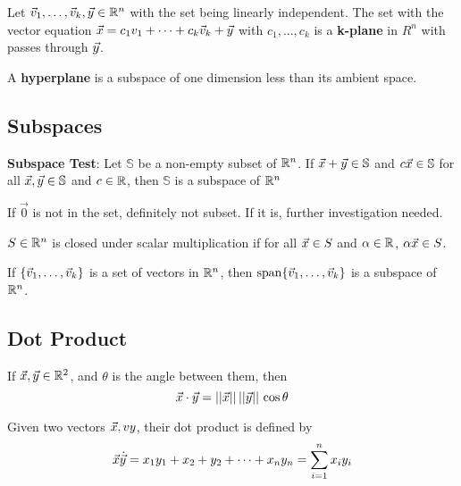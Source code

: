 \documentclass[english, 12pt]{article}
\begin{document}
\begin{defn}
Let $\vec{v}_{1},\dots,\vec{v}_{k},\vec{y} \in {\mathbb{R}}^n$ with the set being linearly independent. The set with the vector equation $\vec{x} = c_{1} v_{1} + \cdots + c_{k} \vec{v}_{k} + \vec{y}$ with $c_{1},\dots,c_{k}$ is a \textbf{k-plane} in $R^n$ with passes through $\vec{y}$.
\end{defn}

\begin{defn}
A \textbf{hyperplane} is a subspace of one dimension less than its ambient space.
\end{defn}

\subsection{Subspaces}

\begin{thrm}
\textbf{Subspace Test}: Let $\mathbb{S}$ be a non-empty subset of ${\mathbb{R}}^n$. If $\vec{x} + \vec{y} \in \mathbb{S}$ and $c \vec{x} \in \mathbb{S}$ for all $\vec{x},\vec{y} \in \mathbb{S}$ and $c \in {\mathbb{R}}$, then $\mathbb{S}$ is a subspace of ${\mathbb{R}}^n$
\end{thrm}

\begin{qte}
If $\vec{0}$ is not in the set, definitely not subset. If it is, further investigation needed.
\end{qte}

\begin{defn}
$S \in {\mathbb{R}}^n$ is closed under scalar multiplication if for all $\vec{x} \in S$ and $\alpha \in {\mathbb{R}}$, $\alpha \vec{x} \in S$.
\end{defn}

\begin{thrm}
If $\{\vec{v}_{1},\dots,\vec{v}_{k}\}$ is a set of vectors in ${\mathbb{R}}^n$, then $\operatorname{span} \{\vec{v}_{1},\dots,\vec{v}_{k}\}$ is a subspace of ${\mathbb{R}}^n$.
\end{thrm}

\subsection{Dot Product}

\begin{thrm}
If $\vec{x},\vec{y} \in {\mathbb{R}}^2$, and $\theta$ is the angle between them, then
\[\vec{x} \cdot \vec{y} = ||\vec{x}||\,||\vec{y}||\, \cos \theta\]
\end{thrm}

\begin{defn}
Given two vectors $\vec{x},vy$, their dot product is defined by
\[\vec{x} \dot {\vec{y}} = x_{1} y_{1} + x_{2} + y_{2} + \cdots + x_{n} y_{n} = \sum_{i=1}^n x_{i} y_{i}\]
\end{defn}
\end{document}
